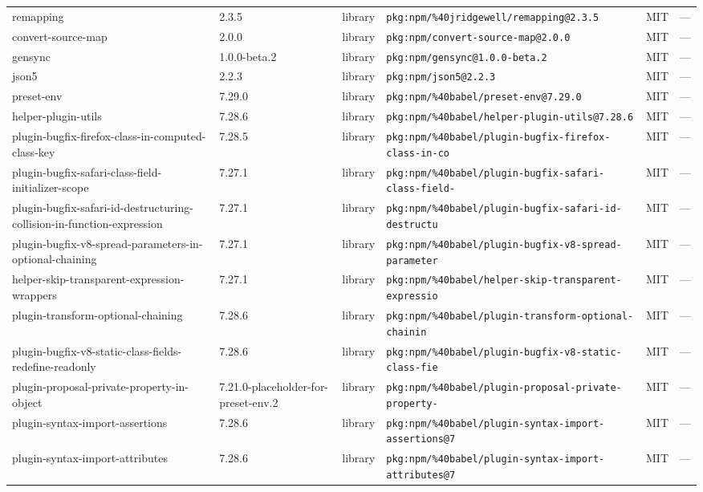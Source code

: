 \documentclass[11pt]{article}
\begin{document}
\begin{longtable}{|l|l|l|p{2.2cm}|l|p{4cm}|}
remapping & 2.3.5 & library & \texttt{pkg:npm/\%40jridgewell/remapping@2.3.5} & MIT & — \\
convert-source-map & 2.0.0 & library & \texttt{pkg:npm/convert-source-map@2.0.0} & MIT & — \\
gensync & 1.0.0-beta.2 & library & \texttt{pkg:npm/gensync@1.0.0-beta.2} & MIT & — \\
json5 & 2.2.3 & library & \texttt{pkg:npm/json5@2.2.3} & MIT & — \\
preset-env & 7.29.0 & library & \texttt{pkg:npm/\%40babel/preset-env@7.29.0} & MIT & — \\
helper-plugin-utils & 7.28.6 & library & \texttt{pkg:npm/\%40babel/helper-plugin-utils@7.28.6} & MIT & — \\
plugin-bugfix-firefox-class-in-computed-class-key & 7.28.5 & library & \texttt{pkg:npm/\%40babel/plugin-bugfix-firefox-class-in-co} & MIT & — \\
plugin-bugfix-safari-class-field-initializer-scope & 7.27.1 & library & \texttt{pkg:npm/\%40babel/plugin-bugfix-safari-class-field-} & MIT & — \\
plugin-bugfix-safari-id-destructuring-collision-in-function-expression & 7.27.1 & library & \texttt{pkg:npm/\%40babel/plugin-bugfix-safari-id-destructu} & MIT & — \\
plugin-bugfix-v8-spread-parameters-in-optional-chaining & 7.27.1 & library & \texttt{pkg:npm/\%40babel/plugin-bugfix-v8-spread-parameter} & MIT & — \\
helper-skip-transparent-expression-wrappers & 7.27.1 & library & \texttt{pkg:npm/\%40babel/helper-skip-transparent-expressio} & MIT & — \\
plugin-transform-optional-chaining & 7.28.6 & library & \texttt{pkg:npm/\%40babel/plugin-transform-optional-chainin} & MIT & — \\
plugin-bugfix-v8-static-class-fields-redefine-readonly & 7.28.6 & library & \texttt{pkg:npm/\%40babel/plugin-bugfix-v8-static-class-fie} & MIT & — \\
plugin-proposal-private-property-in-object & 7.21.0-placeholder-for-preset-env.2 & library & \texttt{pkg:npm/\%40babel/plugin-proposal-private-property-} & MIT & — \\
plugin-syntax-import-assertions & 7.28.6 & library & \texttt{pkg:npm/\%40babel/plugin-syntax-import-assertions@7} & MIT & — \\
plugin-syntax-import-attributes & 7.28.6 & library & \texttt{pkg:npm/\%40babel/plugin-syntax-import-attributes@7} & MIT & — \\

\end{longtable}
\end{document}
